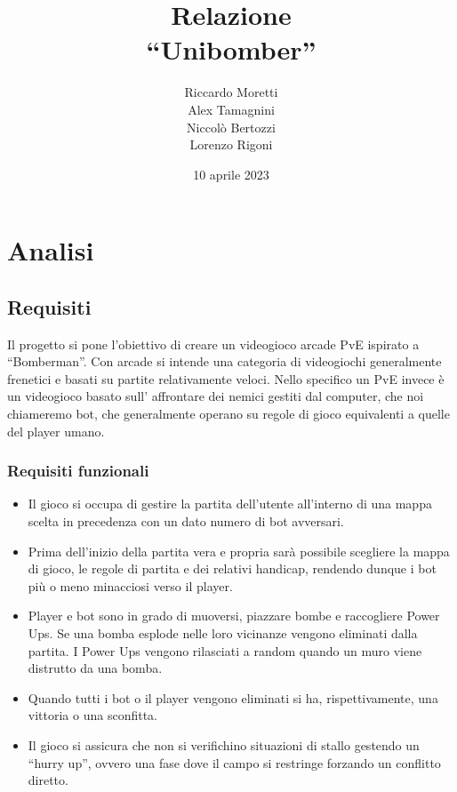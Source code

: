 \documentclass[a4paper,12pt]{report}
\title{Relazione \\``Unibomber''}
\author{Riccardo Moretti \\ Alex Tamagnini \\ Niccolò Bertozzi \\Lorenzo Rigoni}
\date{10 aprile 2023}
\begin{document}
\maketitle

\tableofcontents

\chapter{Analisi}

\section{Requisiti}
Il progetto si pone l’obiettivo di creare un videogioco arcade PvE ispirato a “Bomberman”. Con arcade si intende una categoria di videogiochi generalmente frenetici e basati su partite relativamente veloci. Nello specifico un PvE invece è un videogioco basato sull’ affrontare dei nemici gestiti dal computer, che noi chiameremo bot, che generalmente operano su regole di gioco equivalenti a quelle del player umano.

\subsection*{Requisiti funzionali}
\begin{itemize}
    \item Il gioco si occupa di gestire la partita dell’utente all’interno di una mappa scelta in precedenza con un dato numero di bot avversari.
    \item Prima dell’inizio della partita vera e propria sarà possibile scegliere la mappa di gioco, le regole di partita e dei relativi handicap, rendendo dunque i bot più o meno minacciosi verso il player.
    \item Player e bot sono in grado di muoversi, piazzare bombe e raccogliere Power Ups. Se una bomba esplode nelle loro vicinanze vengono eliminati dalla partita. I Power Ups vengono rilasciati a random quando un muro viene distrutto da una bomba.
    \item Quando tutti i bot o il player vengono eliminati si ha, rispettivamente, una vittoria o una sconfitta.
    \item Il gioco si assicura che non si verifichino situazioni di stallo gestendo un “hurry up”, ovvero una fase dove il campo si restringe forzando un conflitto diretto.

\end{itemize}
\end{document}
